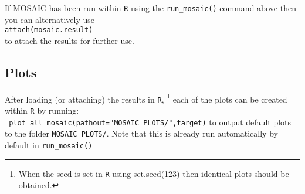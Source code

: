 \documentclass{article}
\begin{document}
If MOSAIC has been run within \texttt{R} using the \verb+run_mosaic()+ command above then you can alternatively use\\
\verb+attach(mosaic.result)+ \\
to attach the results for further use. 

\subsection{Plots}
After loading (or attaching) the results in \texttt{R},  
\footnote{When the seed is set in \texttt{R} using set.seed(123) then identical plots should be obtained.}
each of the plots can be created within \texttt{R} by running:\\
\verb+ plot_all_mosaic(pathout="MOSAIC_PLOTS/",target)+
to output default plots to the folder \texttt{MOSAIC\_PLOTS/}. 
Note that this is already run automatically by default in \verb+run_mosaic()+
\end{document}
